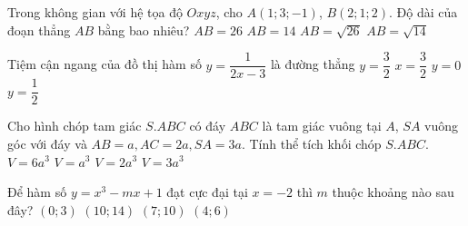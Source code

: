 \begin{ex}%
	Trong không gian với hệ tọa độ $Oxyz$, cho $A\left(1;3;-1\right)$, $B\left(2;1;2\right)$. Độ dài của đoạn thẳng $AB$ bằng bao nhiêu?
	\choice
	{$AB=26$}
	{$AB=14$}
	{$AB=\sqrt{26}$}
	{\True $AB=\sqrt{14}$}
\end{ex}
\begin{ex}%
	Tiệm cận ngang của đồ thị hàm số $y=\dfrac{1}{2x-3}$ là đường thẳng
	\choice
	{$y=\dfrac{3}{2}$}
	{$x=\dfrac{3}{2}$}
	{\True $y=0$}
	{$y=\dfrac{1}{2}$}
\end{ex}
\begin{ex}%
	Cho hình chóp tam giác $S.ABC$ có đáy $ABC$ là tam giác vuông tại $A$, $SA$ vuông góc với đáy và $AB=a,AC=2a,SA=3a$. Tính thể tích khối chóp $S.ABC$.
	\choice
	{$V=6a^3$}
	{\True $V=a^3$}
	{$V=2a^3$}
	{$V=3a^3$}
\end{ex}
\begin{ex}%
	Để hàm số $y=x^3-mx+1$ đạt cực đại tại $x=-2$ thì $m$ thuộc khoảng nào sau đây?
	\choice
	{$\left(0;3\right)$}
	{\True $\left(10;14\right)$}
	{$\left(7;10\right)$}
	{$\left(4;6\right)$}
\end{ex}
